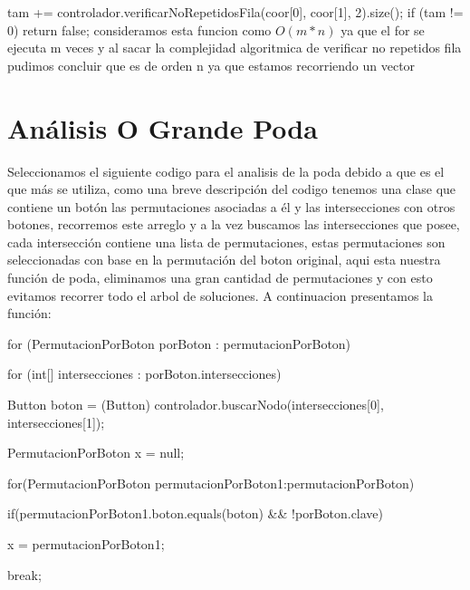 \documentclass[conference]{IEEEtran}
\begin{document}
	\hspace{-40pt}tam += controlador.verificarNoRepetidosFila(coor[0], coor[1], 2).size();
	if (tam != 0) \textbraceleft
		return false;
	\textbraceright\newline
\textbraceright
consideramos esta funcion como $O(m*n)$ ya que el for se ejecuta m veces y al sacar la complejidad algoritmica de verificar no repetidos fila pudimos concluir que es de orden n ya que estamos recorriendo un vector


\section{Análisis O Grande Poda}
Seleccionamos el siguiente codigo para el analisis de la poda debido a que es el que más se utiliza, como una breve descripción del codigo tenemos una clase que contiene un botón las permutaciones asociadas a él y las intersecciones con otros botones, recorremos este arreglo y a la vez buscamos las intersecciones que posee, cada intersección contiene una lista de permutaciones, estas permutaciones son seleccionadas con base en la permutación del boton original, aqui esta nuestra función de poda, eliminamos una gran cantidad de permutaciones y con esto evitamos recorrer todo el arbol de soluciones. A continuacion presentamos la función:

\hspace{-30pt}for (PermutacionPorBoton porBoton : permutacionPorBoton)\textbraceleft

\hspace{10pt}for (int[] intersecciones : porBoton.intersecciones)\textbraceleft

\hspace{-10pt}Button boton = (Button) controlador.buscarNodo(intersecciones[0], intersecciones[1]);

\hspace{10pt}PermutacionPorBoton x = null;

\hspace{-50pt}for(PermutacionPorBoton permutacionPorBoton1:permutacionPorBoton)\textbraceleft

\hspace{-29pt}if(permutacionPorBoton1.boton.equals(boton) \&\& !porBoton.clave)\textbraceleft

\hspace{20pt}x = permutacionPorBoton1;

\hspace{20pt}break;

\hspace{50pt}\textbraceright
\end{document}

